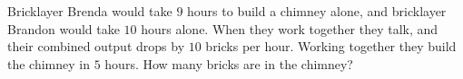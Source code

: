 Bricklayer Brenda would take $9$ hours to build a chimney alone, and bricklayer Brandon would take $10$ hours alone. When they work together they talk, and their combined output drops by $10$ bricks per hour. Working together they build the chimney in $5$ hours. How many bricks are in the chimney?
